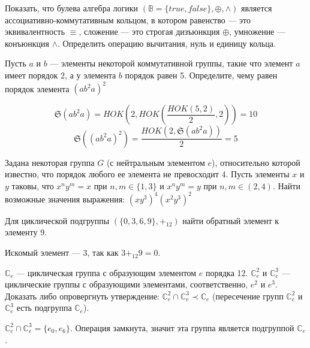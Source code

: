 \begin{task}
    Показать, что булева алгебра логики $(\mathbb{B}=\{true, false\}, \oplus, \wedge)$ является ассоциативно-коммутативным кольцом, в котором равенство --- это эквивалентность $\equiv$, сложение --- это строгая дизъюнкция $\oplus$, умножение --- конъюнкция $\wedge$. Определить операцию вычитания, нуль и единицу кольца.
\end{task}

\begin{task}
    Пусть $a$ и $b$ — элементы некоторой коммутативной группы, такие что элемент $a$ имеет порядок 2, а у элемента $b$ порядок равен 5. Определите, чему равен порядок элемента $(ab^2a)^2$

    \begin{solution}
        \begin{equation*}
            \mathfrak{S}(ab^2a) = HOK(2, HOK(\frac{HOK(5, 2)}{2}, 2)) = 10
        \end{equation*}
        \begin{equation*}
            \mathfrak{S}((ab^2a)^2) = \frac{HOK(2, \mathfrak{S}(ab^2a))}{2} = 5
        \end{equation*}
    \end{solution}
\end{task}

\begin{task}
    Задана некоторая группа $G$ (с нейтральным элементом $e$), относительно которой известно, что порядок любого ее элемента не превосходит 4. Пусть элементы $x$ и $y$ таковы, что $x^ny^m = x$ при $n,m \in \{1,3\}$ и $x^ny^m = y$ при $n, m \in (2, 4)$. Найти возможные значения выражения: $(xy^3)^4(x^2y^3)^2$
\end{task}

\begin{task}
    Для циклической подгруппы $(\{0,3,6,9\}, +_{12})$ найти обратный элемент к элементу $9$.

    \begin{solution}
        Искомый элемент --- $3$, так как $3+_{12}9=0$.
    \end{solution}
\end{task}

\begin{task}
    $\mathbb{C}_e$ — циклическая группа с образующим элементом $e$ порядка 12.
    $\mathbb{C}_e^2$ и $\mathbb{C}_e^3$ — циклические группы с образующими элементами, соответственно, $e^2$ и $e^3$.
    Доказать либо опровергнуть утверждение: $\mathbb{C}_e^2 \cap \mathbb{C}_e^3 \prec  \mathbb{C}_e$ 
    (пересечение групп $\mathbb{C}_e^2$ и $\mathbb{C}_e^3$ есть подгруппа $\mathbb{C}_e$).

    \begin{solution}
        $\mathbb{C}_e^2 \cap \mathbb{C}_e^3 = \{e_0, e_6\}$.
        Операция замкнута, значит эта группа является подгруппой $\mathbb{C}_e$.
    \end{solution}
\end{task}

